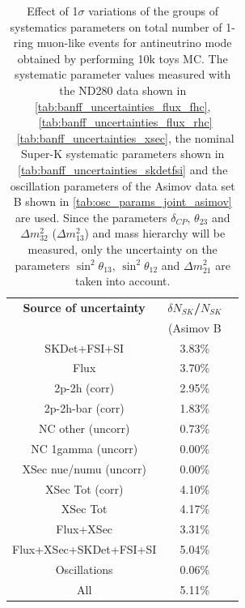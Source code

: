 

\begin{table}[htb]
\centering
\begin{tabular}{| c | c | c |}
\hline
  {\bf Source of uncertainty}    & \multicolumn{1}{c|}{{\bf ${\delta}N_{SK}$/$N_{SK}$}}\\
                                 & \multicolumn{1}{c|}{(Asimov B}\\

\hline
\hline  SKDet+FSI+SI                   & 3.83\%                        \\
\hline
  Flux                           & 3.70\%                        \\
\hline
\hline
  2p-2h (corr)                     & 2.95\%                        \\
  2p-2h-bar (corr)                  & 1.83\%                        \\
  NC other (uncorr)              & 0.73\%                        \\
  NC 1gamma (uncorr)             & 0.00\%                        \\
  XSec nue/numu (uncorr)                  & 0.00\%                        \\
\hline
  XSec Tot (corr)                  & 4.10\%                        \\
  XSec Tot                       & 4.17\%                        \\
\hline
\hline
  Flux+XSec                      & 3.31\%                        \\
\hline
\hline
  Flux+XSec+SKDet+FSI+SI         & 5.04\%                        \\
\hline
\hline
  Oscillations                   & 0.06\%                        \\
\hline
\hline
  All                            & 5.11\%                        \\
\hline
\hline

\end{tabular}
\caption{
 Effect of 1$\sigma$ variations of the groups of systematics parameters on total number of
 1-ring muon-like events for antineutrino mode obtained by performing 10k toys MC.
The systematic parameter values measured with the ND280 data 
shown in 
\cref{tab:banff_uncertainties_flux_fhc},
~\ref{tab:banff_uncertainties_flux_rhc}
~\ref{tab:banff_uncertainties_xsec},
the nominal Super-K systematic parameters shown in \cref{tab:banff_uncertainties_skdetfsi}
and the oscillation parameters of the Asimov data set B shown in \cref{tab:osc_params_joint_asimov}
are used.
Since the parameters $\delta_{CP}$, $\theta_{23}$ and $\Delta m^2_{32}$ ($\Delta m^2_{13}$) and mass hierarchy
will be measured,
only the uncertainty on the parameters 
$\sin^2 \theta_{13}$,
$\sin^2 \theta_{12}$
and 
$\Delta m^2_{21}$ 
are taken into account.
}                                                                                                                                                                                          
\label{tab:nsk_systematic_table_summary_joint_asimov_B_rhc_mulike}
\end{table}



